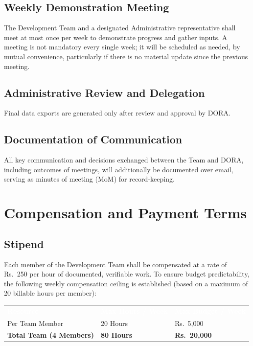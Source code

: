 \documentclass[11pt]{article}
\renewcommand{\arraystretch}{1.15}
\begin{document}
\subsection{Weekly Demonstration Meeting}
The Development Team and a designated Administrative representative shall meet at most once per week to demonstrate progress and gather inputs. A meeting is not mandatory every single week; it will be scheduled as needed, by mutual convenience, particularly if there is no material update since the previous meeting.

\subsection{Administrative Review and Delegation}
Final data exports are generated only after review and approval by DORA.

\subsection{Documentation of Communication}
All key communication and decisions exchanged between the Team and DORA, including outcomes of meetings, will additionally be documented over email, serving as minutes of meeting (MoM) for record-keeping.

\section{Compensation and Payment Terms}
\label{sec:compensation}

\subsection{Stipend}
Each member of the Development Team shall be compensated at a rate of Rs.~250 per hour of documented, verifiable work. To ensure budget predictability, the following weekly compensation ceiling is established (based on a maximum of 20 billable hours per member):

\begin{table}[h]
\centering
\renewcommand{\arraystretch}{1.4}
\begin{tabular}{p{5cm} p{4cm} p{4cm}}
\rowcolor{primary}
\textcolor{white}{\textbf{Resource}} & \textcolor{white}{\textbf{Max Hours / Week}} & \textcolor{white}{\textbf{Max Budget / Week}} \\
\rowcolor{lightbg}
Per Team Member & 20 Hours & Rs.~5,000 \\
\rowcolor{white}
\textbf{Total Team (4 Members)} & \textbf{80 Hours} & \textbf{Rs.~20,000} \\
\end{tabular}
\end{table}
\end{document}
